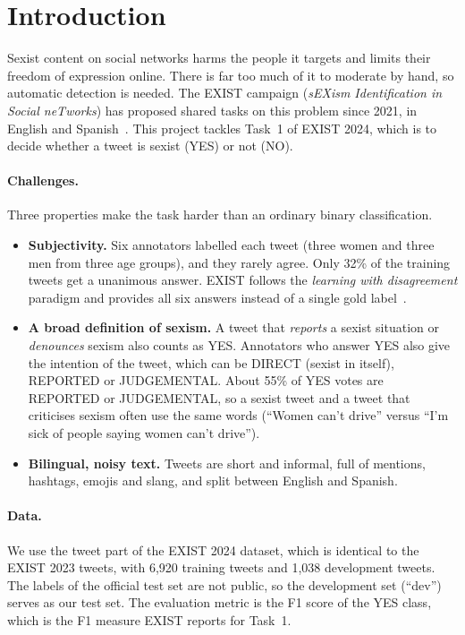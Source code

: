 \documentclass[pdflatex,sn-mathphys-num]{sn-jnl}
\begin{document}
\section{Introduction}\label{sec:intro}

Sexist content on social networks harms the people it targets and limits their freedom of expression online. There is far too much of it to moderate by hand, so automatic detection is needed. The EXIST campaign (\emph{sEXism Identification in Social neTworks}) has proposed shared tasks on this problem since 2021, in English and Spanish~\cite{plaza2024exist}. This project tackles Task~1 of EXIST 2024, which is to decide whether a tweet is sexist (YES) or not (NO).

\paragraph{Challenges.} Three properties make the task harder than an ordinary binary classification.
\begin{itemize}
\item \textbf{Subjectivity.} Six annotators labelled each tweet (three women and three men from three age groups), and they rarely agree. Only 32\% of the training tweets get a unanimous answer. EXIST follows the \emph{learning with disagreement} paradigm and provides all six answers instead of a single gold label~\cite{plaza2024exist}.
\item \textbf{A broad definition of sexism.} A tweet that \emph{reports} a sexist situation or \emph{denounces} sexism also counts as YES. Annotators who answer YES also give the intention of the tweet, which can be DIRECT (sexist in itself), REPORTED or JUDGEMENTAL. About 55\% of YES votes are REPORTED or JUDGEMENTAL, so a sexist tweet and a tweet that criticises sexism often use the same words (``Women can't drive'' versus ``I'm sick of people saying women can't drive'').
\item \textbf{Bilingual, noisy text.} Tweets are short and informal, full of mentions, hashtags, emojis and slang, and split between English and Spanish.
\end{itemize}

\paragraph{Data.} We use the tweet part of the EXIST 2024 dataset, which is identical to the EXIST 2023 tweets, with 6,920 training tweets and 1,038 development tweets. The labels of the official test set are not public, so the development set (``dev'') serves as our test set. The evaluation metric is the F1 score of the YES class, which is the F1 measure EXIST reports for Task~1.
\end{document}
